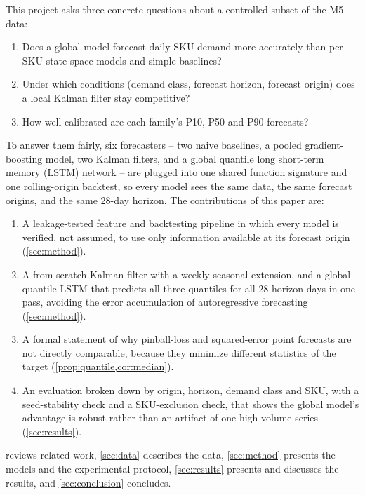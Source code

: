 \documentclass[conference]{IEEEtran}
\begin{document}
This project asks three concrete questions about a controlled subset of the M5 data:
\begin{enumerate}
  \item Does a global model forecast daily SKU demand more accurately than per-SKU state-space
        models and simple baselines?
  \item Under which conditions (demand class, forecast horizon, forecast origin) does a local
        Kalman filter stay competitive?
  \item How well calibrated are each family's P10, P50 and P90 forecasts?
\end{enumerate}
To answer them fairly, six forecasters -- two naive baselines, a pooled gradient-boosting model, two
Kalman filters, and a global quantile long short-term memory (LSTM) network -- are plugged into one
shared function signature and one rolling-origin backtest, so every model sees the same data, the
same forecast origins, and the same 28-day horizon. The contributions of this paper are:
\begin{enumerate}
  \item A leakage-tested feature and backtesting pipeline in which every model is verified, not
        assumed, to use only information available at its forecast origin (\cref{sec:method}).
  \item A from-scratch Kalman filter with a weekly-seasonal extension, and a global quantile LSTM
        that predicts all three quantiles for all 28 horizon days in one pass, avoiding the error
        accumulation of autoregressive forecasting (\cref{sec:method}).
  \item A formal statement of why pinball-loss and squared-error point forecasts are not directly
        comparable, because they minimize different statistics of the target
        (\cref{prop:quantile,cor:median}).
  \item An evaluation broken down by origin, horizon, demand class and SKU, with a seed-stability
        check and a SKU-exclusion check, that shows the global model's advantage is robust rather
        than an artifact of one high-volume series (\cref{sec:results}).
\end{enumerate}
 reviews related work, \cref{sec:data} describes the data,
\cref{sec:method} presents the models and the experimental protocol, \cref{sec:results} presents
and discusses the results, and \cref{sec:conclusion} concludes.

\end{document}
